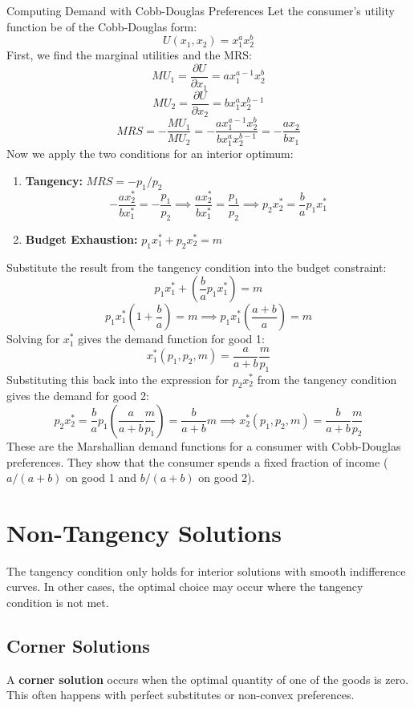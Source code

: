 \begin{examplebox}{Computing Demand with Cobb-Douglas Preferences}
Let the consumer's utility function be of the Cobb-Douglas form:
\[ U(x_1, x_2) = x_1^a x_2^b \]
First, we find the marginal utilities and the MRS:
\[ MU_1 = \frac{\partial U}{\partial x_1} = ax_1^{a-1}x_2^b \]
\[ MU_2 = \frac{\partial U}{\partial x_2} = bx_1^a x_2^{b-1} \]
\[ MRS = -\frac{MU_1}{MU_2} = -\frac{ax_1^{a-1}x_2^b}{bx_1^a x_2^{b-1}} = -\frac{ax_2}{bx_1} \]
Now we apply the two conditions for an interior optimum:
\begin{enumerate}
    \item \textbf{Tangency:} $MRS = -p_1/p_2$
    \[ -\frac{ax_2^*}{bx_1^*} = -\frac{p_1}{p_2} \implies \frac{ax_2^*}{bx_1^*} = \frac{p_1}{p_2} \implies p_2x_2^* = \frac{b}{a} p_1x_1^* \]
    \item \textbf{Budget Exhaustion:} $p_1x_1^* + p_2x_2^* = m$
\end{enumerate}
Substitute the result from the tangency condition into the budget constraint:
\[ p_1x_1^* + \left(\frac{b}{a} p_1x_1^*\right) = m \]
\[ p_1x_1^* \left(1 + \frac{b}{a}\right) = m \implies p_1x_1^* \left(\frac{a+b}{a}\right) = m \]
Solving for $x_1^*$ gives the demand function for good 1:
\[ x_1^*(p_1, p_2, m) = \frac{a}{a+b} \frac{m}{p_1} \]
Substituting this back into the expression for $p_2x_2^*$ from the tangency condition gives the demand for good 2:
\[ p_2x_2^* = \frac{b}{a} p_1 \left( \frac{a}{a+b} \frac{m}{p_1} \right) = \frac{b}{a+b} m \implies x_2^*(p_1, p_2, m) = \frac{b}{a+b} \frac{m}{p_2} \]
These are the Marshallian demand functions for a consumer with Cobb-Douglas preferences. They show that the consumer spends a fixed fraction of income ($a/(a+b)$ on good 1 and $b/(a+b)$ on good 2).
\end{examplebox}


\section{Non-Tangency Solutions}

The tangency condition only holds for interior solutions with smooth indifference curves. In other cases, the optimal choice may occur where the tangency condition is not met.

\subsection{Corner Solutions}
A \textbf{corner solution} occurs when the optimal quantity of one of the goods is zero. This often happens with perfect substitutes or non-convex preferences.

